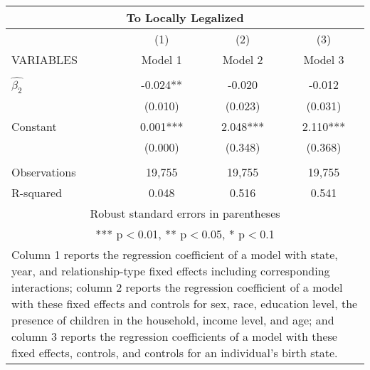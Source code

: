 \begin{tabular}{lccc}
\multicolumn{4}{c}{To Locally Legalized} \\ \hline
 & (1) & (2) & (3) \\
VARIABLES & Model 1 & Model 2 & Model 3 \\ \hline
 &  &  &  \\
$\hat{\beta_2}$ & -0.024** & -0.020 & -0.012 \\
 & (0.010) & (0.023) & (0.031) \\
Constant & 0.001*** & 2.048*** & 2.110*** \\
 & (0.000) & (0.348) & (0.368) \\
 &  &  &  \\
Observations & 19,755 & 19,755 & 19,755 \\
 R-squared & 0.048 & 0.516 & 0.541 \\ \hline
\multicolumn{4}{c}{ Robust standard errors in parentheses} \\
\multicolumn{4}{c}{ *** p$<$0.01, ** p$<$0.05, * p$<$0.1} \\
\multicolumn{4}{p{0.8\linewidth}}{\small Column 1 reports the regression coefficient of a model with state, year, and relationship-type fixed effects including corresponding interactions; column 2 reports the regression coefficient of a model with these fixed effects and controls for sex, race, education level, the presence of children in the household, income level, and age; and column 3 reports the regression coefficients of a model with these fixed effects, controls, and controls for an individual’s birth state.} \\
\end{tabular}

